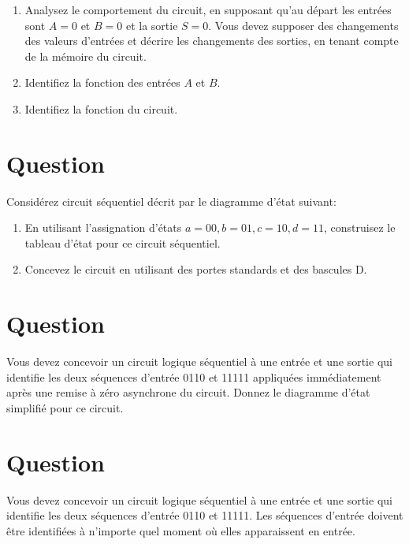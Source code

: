 \documentclass[letter, oneside]{book}
\begin{document}
\begin{enumerate}
\item Analysez le comportement du circuit, en supposant qu'au départ les
entrées sont \(A=0\) et \(B=0\) et la sortie \(S=0\). Vous devez
supposer des changements des valeurs d'entrées et décrire les
changements des sorties, en tenant compte de la mémoire du
circuit.

\item Identifiez la fonction des entrées \(A\) et \(B\).

\item Identifiez la fonction du circuit.
\end{enumerate}

\section*{Question}
\label{sec:org6895df3}
Considérez circuit séquentiel décrit par le diagramme d'état suivant:
\begin{center}

\end{center}
\begin{enumerate}
\item En utilisant l'assignation d'états \(a = 00, b = 01, c = 10, d
         = 11\), construisez le tableau d'état pour ce circuit séquentiel.

\item Concevez le circuit en utilisant des portes standards et des
bascules D.
\end{enumerate}

\section*{Question}
\label{sec:orgf39f9ea}
Vous devez concevoir un circuit logique séquentiel à une entrée et
  une sortie qui identifie les deux séquences d'entrée 0110 et 11111
  appliquées immédiatement après une remise à zéro asynchrone du
  circuit. Donnez le diagramme d'état simplifié pour ce circuit.

\section*{Question}
\label{sec:org8474253}
Vous devez concevoir un circuit logique séquentiel à une entrée et
 une sortie qui identifie les deux séquences d'entrée 0110
 et 11111. Les séquences d'entrée doivent être identifiées à
 n'importe quel moment où elles apparaissent en entrée.
\end{document}
